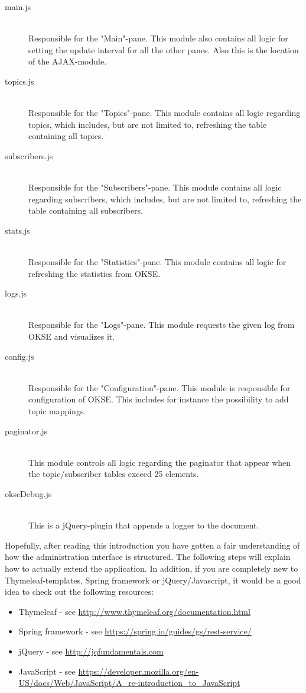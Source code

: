 \begin{description}
    \item[main.js] \hfill \\ Responsible for the "Main"-pane. This module also contains all logic for setting the update interval for all the other panes. Also this is the location of the AJAX-module. 
    \item[topics.js] \hfill \\ Responsible for the "Topics"-pane. This module contains all logic regarding topics, which includes, but are not limited to, refreshing the table containing all topics. 
    \item[subscribers.js] \hfill \\ Responsible for the "Subscribers"-pane. This module contains all logic regarding subscribers, which includes, but are not limited to, refreshing the table containing all subscribers. 
    \item[stats.js] \hfill \\ Responsible for the "Statistics"-pane. This module contains all logic for refreshing the statistics from OKSE.
    \item[logs.js] \hfill \\ Responsible for the "Logs"-pane. This module requests the given log from OKSE and visualizes it.
    \item[config.js] \hfill \\ Responsible for the "Configuration"-pane. This module is responsible for configuration of OKSE. This includes for instance the possibility to add topic mappings. 
    \item[paginator.js] \hfill \\ This module controls all logic regarding the paginator that appear when the topic/subscriber tables exceed 25 elements. 
    \item[okseDebug.js] \hfill \\ This is a jQuery-plugin that appends a logger to the document.
\end{description}

Hopefully, after reading this introduction you have gotten a fair understanding of how the administration interface is structured. The following steps will explain how to actually extend the application. In addition, if you are completely new to Thymeleaf-templates, Spring framework or jQuery/Javascript, it would be a good idea to check out the following resources: 

\begin{itemize}
\setlength{\itemsep}{0cm}%
\item Thymeleaf - see \url{http://www.thymeleaf.org/documentation.html}
\item Spring framework - see \url{https://spring.io/guides/gs/rest-service/}
\item jQuery - see \url{http://jqfundamentals.com}
\item JavaScript - see \url{https://developer.mozilla.org/en-US/docs/Web/JavaScript/A_re-introduction_to_JavaScript}
\end{itemize}

